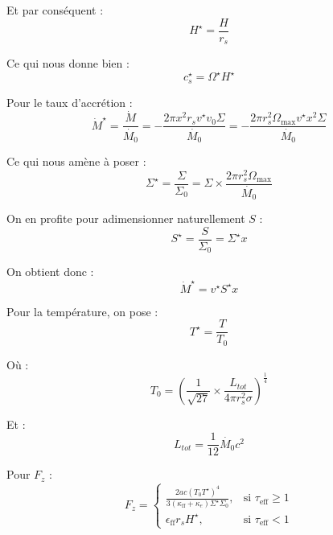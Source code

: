 Et par conséquent :
\begin{equation}
    H^\star = \frac{H}{r_s}
\end{equation}

Ce qui nous donne bien :
\begin{equation}
    c_s^\star = \Omega^\star H^\star
\end{equation}

Pour le taux d’accrétion :
\begin{equation}
    \dot{M}^\star = \frac{\dot{M}}{\dot{M_0}} = − \frac{2 \pi x^2 r_s v^\star v_0 \Sigma}{\dot{M_0}} = − \frac{2 \pi r_s^2 \Omega_\mathrm{max} v^\star x^2 \Sigma}{\dot{M_0}} 
\end{equation}

Ce qui nous amène à poser :
\begin{equation}
    \Sigma^\star = \frac{\Sigma}{\Sigma_0} = \Sigma × \frac{2 \pi r_s^2 \Omega_\mathrm{max}}{\dot{M_0}}
\end{equation}

On en profite pour adimensionner naturellement $S$ :
\begin{equation}
    S^\star = \frac{S}{\Sigma_0} = \Sigma^\star x
\end{equation}

On obtient donc :
\begin{equation}
    \dot{M}^\star = v^\star S^\star x
\end{equation}

Pour la température, on pose :
\begin{equation}
    T^{\star} = \frac{T}{T_0}
\end{equation}

Où :
\begin{equation}
    T_0 = \left(\frac{1}{\sqrt{27}} × \frac{L_{tot}}{4 \pi r_s^2 \sigma} \right)^{\frac{1}{4}}
\end{equation}

Et :
\begin{equation}
    L_{tot} = \frac{1}{12} \dot{M_0} c^2
\end{equation}

Pour $F_z$ :
\begin{equation}
    F_z =
    \begin{cases}
        \frac{2 a c \left(T_0 T^\star\right)^4}{3 (\kappa_\mathrm{ff} + \kappa_e)\Sigma^\star \Sigma_0}, &\text{si $\tau_\mathrm{eff} \geq 1$} \\
        \epsilon_\mathrm{ff} r_s H^\star, &\text{si $\tau_\mathrm{eff} < 1$}
    \end{cases}
\end{equation}


